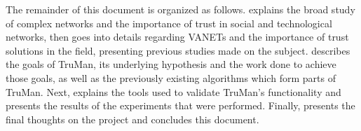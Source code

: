 The remainder of this document is organized as follows.  explains the broad study of complex networks and the importance of trust in social and technological networks, then goes into details regarding VANETs and the importance of trust solutions in the field, presenting previous studies made on the subject.
 describes the goals of TruMan, its underlying hypothesis and the work done to achieve those goals, as well as the previously existing algorithms which form parts of TruMan.
Next,  explains the tools used to validate TruMan's functionality and presents the results of the experiments that were performed.
Finally,  presents the final thoughts on the project and concludes this document.

